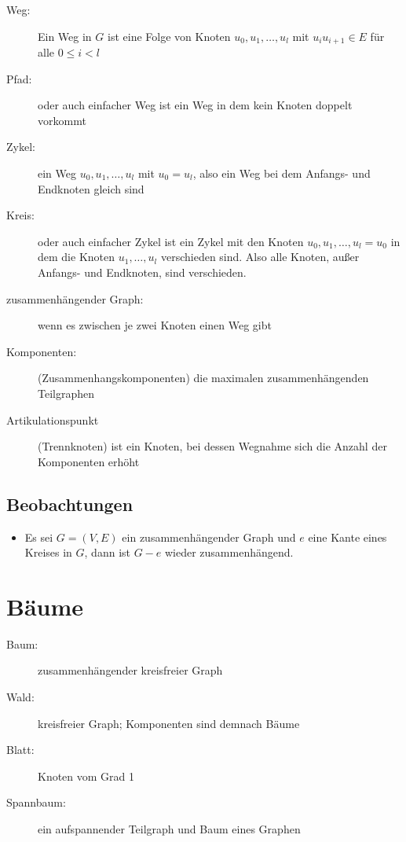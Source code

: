 \documentclass[%
a4paper, %
9pt,              %
leqno,            %
fleqn,            %
]
{scrartcl}
\begin{document}
\begin{description}
  \item[Weg:] Ein Weg in $G$ ist eine Folge von Knoten $u_0, u_1, \dots, u_l$
    mit $u_i u_{i+1} \in E$ für alle $0 \leq i < l$
  \item[Pfad:] oder auch einfacher Weg ist ein Weg in dem kein Knoten doppelt
    vorkommt
  \item[Zykel:] ein Weg $u_0, u_1, \dots, u_l$ mit $u_0 = u_l$, also ein Weg bei
    dem Anfangs- und Endknoten gleich sind
  \item[Kreis:] oder auch einfacher Zykel ist ein Zykel mit den Knoten $u_0,
    u_1, \dots, u_l = u_0$ in dem die Knoten $u_1, \dots, u_l$ verschieden sind.
    Also alle Knoten, außer Anfangs- und Endknoten, sind verschieden.
  \item[zusammenhängender Graph:] wenn es zwischen je zwei Knoten einen Weg gibt
  \item[Komponenten:] (Zusammenhangskomponenten) die maximalen zusammenhängenden
    Teilgraphen
  \item[Artikulationspunkt] (Trennknoten) ist ein Knoten, bei dessen Wegnahme
    sich die Anzahl der Komponenten erhöht
\end{description}

\subsection*{Beobachtungen} %
\label{sub:Beobachtungen}

\begin{itemize}
  \item Es sei $G = (V,E)$ ein zusammenhängender Graph und $e$ eine Kante eines
    Kreises in $G$, dann ist $G-e$ wieder zusammenhängend.
\end{itemize}



\section*{Bäume} %
\label{sec:Bäume}

\begin{description}
  \item[Baum:] zusammenhängender kreisfreier Graph
  \item[Wald:] kreisfreier Graph; Komponenten sind demnach Bäume
  \item[Blatt:] Knoten vom Grad 1
  \item[Spannbaum:] ein aufspannender Teilgraph und Baum eines Graphen
\end{description}
\end{document}
